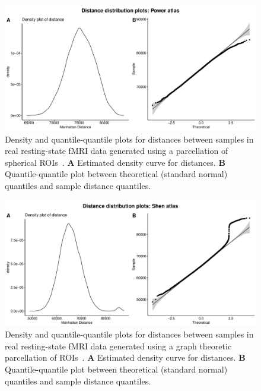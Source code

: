 \documentclass[10pt,letterpaper]{article}\usepackage[]{graphicx}\usepackage[]{color}
\begin{document}
\begin{figure}[H]
	\includegraphics[width=\textwidth]{manhattan-distance_hist_power-atlas.pdf}
	\caption{Density and quantile-quantile plots for distances between samples in real resting-state fMRI data generated using a parcellation of spherical ROIs~\cite{power2011}. \textbf{A} Estimated density curve for distances. \textbf{B} Quantile-quantile plot between theoretical (standard normal) quantiles and sample distance quantiles.}
\end{figure}

\begin{figure}[H]
	\includegraphics[width=\textwidth]{manhattan-distance_hist_shen-atlas.pdf}
	\caption{Density and quantile-quantile plots for distances between samples in real resting-state fMRI data generated using a graph theoretic parcellation of ROIs~\cite{shen2013}. \textbf{A} Estimated density curve for distances. \textbf{B} Quantile-quantile plot between theoretical (standard normal) quantiles and sample distance quantiles.}
\end{figure}



\end{document}

